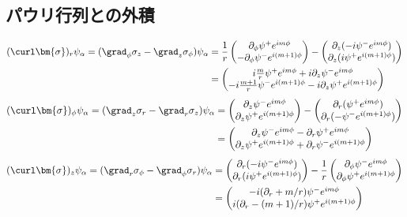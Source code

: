 \documentclass[a4paper,11pt,uplatex]{jsarticle}%
\begin{document}
\subsection*{パウリ行列との外積}
\begin{align}
  (\curl\bm{\sigma})_r\psi_{\alpha} = (\grad_{\phi}\sigma_z - \grad_{z}\sigma_{\phi})\psi_{\alpha} 
  &= \frac{1}{r}
  \begin{pmatrix}
   \partial_{\phi}\psi^{+}e^{im\phi} \\
    -\partial_{\phi}\psi^{-}e^{i(m+1)\phi}
  \end{pmatrix}
  -\begin{pmatrix}
    \partial_{z}(-i\psi^{-}e^{im\phi}) \\
    \partial_{z}(i\psi^{+}e^{i(m+1)\phi})
  \end{pmatrix} \\
  &=
  \begin{pmatrix}
    i\frac{m}{r}\psi^{+}e^{im\phi}  + i\partial_z \psi^{-}e^{im\phi} \\
    -i\frac{m+1}{r}\psi^{-}e^{i(m+1)\phi} - i\partial_z \psi^{+}e^{i(m+1)\phi}
  \end{pmatrix}
\end{align}
\begin{align}
  (\curl\bm{\sigma})_{\phi}\psi_{\alpha} = (\grad_{z}\sigma_r - \grad_{r}\sigma_{z})\psi_{\alpha} 
  &=
  \begin{pmatrix}
    \partial_{z}\psi^{-}e^{im\phi} \\
    \partial_{z}\psi^{+}e^{i(m+1)\phi}
  \end{pmatrix}
  -\begin{pmatrix}
    \partial_{r}(\psi^{+}e^{im\phi}) \\
    \partial_{r}(-\psi^{-}e^{i(m+1)\phi})
  \end{pmatrix} \\
  &=
  \begin{pmatrix}
    \partial_z \psi^{-}e^{im\phi} - \partial_r \psi^{+}e^{im\phi} \\
    \partial_z \psi^{+}e^{i(m+1)\phi} + \partial_r \psi^{-}e^{i(m+1)\phi}
  \end{pmatrix}
\end{align}
\begin{align}
  (\curl\bm{\sigma})_{z}\psi_{\alpha} = (\grad_{r}\sigma_{\phi} - \grad_{\phi}\sigma_{r})\psi_{\alpha}
  &= 
  \begin{pmatrix}
    \partial_{r}(-i\psi^{-}e^{im\phi}) \\
    \partial_{r}(i\psi^{+}e^{i(m+1)\phi})
  \end{pmatrix}
  -\frac{1}{r}
  \begin{pmatrix}
    \partial_{\phi}\psi^{-}e^{im\phi} \\
    \partial_{\phi}\psi^{+}e^{i(m+1)\phi}
  \end{pmatrix} \\
  &=
  \begin{pmatrix}
    -i(\partial_r + m/r)\psi^{-}e^{im\phi} \\
    i(\partial_r - (m+1)/r)\psi^{+}e^{i(m+1)\phi}
  \end{pmatrix}
\end{align}
\end{document}

